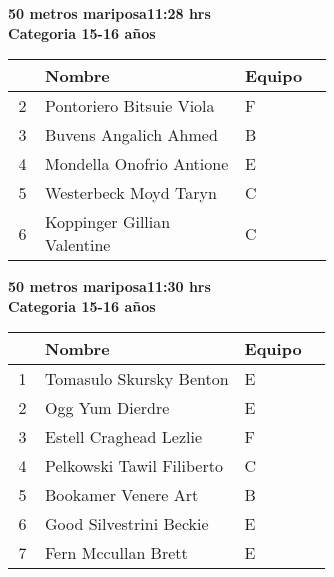 \begin{minipage}{0.95\linewidth}\vspace{0.5cm} 
\begin{flushleft}
\textbf{
\hspace{-0.15cm}50 metros mariposa\hspace{1.5cm}11:28 hrs \\Categoria 15-16 años}\vspace{-0.2cm} 
\end{flushleft}
\begin{tabular}{cp{0.63\linewidth}l}
\hline
& \textbf{Nombre} & \textbf{Equipo} \\ \hline
2 & Pontoriero Bitsuie Viola & F \\ 
3 & Buvens Angalich Ahmed & B \\ 
4 & Mondella Onofrio Antione & E \\ 
5 & Westerbeck Moyd Taryn & C \\ 
6 & Koppinger Gillian Valentine & C \\ 
\end{tabular}
\end{minipage}
\begin{minipage}{0.95\linewidth}\vspace{0.5cm} 
\begin{flushleft}
\textbf{
\hspace{-0.15cm}50 metros mariposa\hspace{1.5cm}11:30 hrs \\Categoria 15-16 años}\vspace{-0.2cm} 
\end{flushleft}
\begin{tabular}{cp{0.63\linewidth}l}
\hline
& \textbf{Nombre} & \textbf{Equipo} \\ \hline
1 & Tomasulo Skursky Benton & E \\ 
2 & Ogg Yum Dierdre & E \\ 
3 & Estell Craghead Lezlie & F \\ 
4 & Pelkowski Tawil Filiberto & C \\ 
5 & Bookamer Venere Art & B \\ 
6 & Good Silvestrini Beckie & E \\ 
7 & Fern Mccullan Brett & E \\ 
\end{tabular}
\end{minipage}
